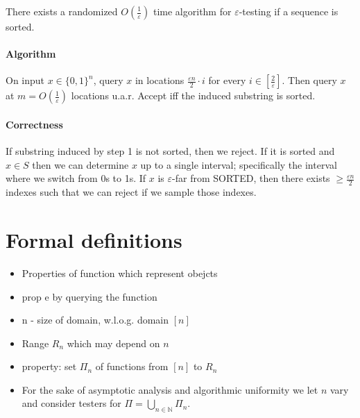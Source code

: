 \documentclass{idc_msc}
\begin{document}
There exists a randomized \(O(\frac{1}{\varepsilon})\) time algorithm for \(\varepsilon\)-testing if a sequence is sorted.

\paragraph{Algorithm}

On input \(x \in {\{0,1\}}^{n}\), query \(x\) in locations \(\frac{\varepsilon n}{2} \cdot i\) for every \(i \in [\frac{2}{\varepsilon}]\).
Then query \(x\) at \(m = O(\frac{1}{\varepsilon})\) locations u.a.r.
Accept iff the induced substring is sorted.

\paragraph{Correctness}

If substring induced by step 1 is not sorted, then we reject.
If it is sorted and \(x \in S\) then we can determine \(x\) up to a single interval; specifically the interval where we switch from 0s to 1s.
If \(x\) is \(\varepsilon\)-far from SORTED, then there exists \(\ge \frac{\varepsilon n}{2}\) indexes such that we can reject if we sample those indexes.



\pagebreak
\section{Formal definitions}

\begin{itemize}
  \item Properties of function which represent obejcts
  \item prop e by querying the function
  \item n - size of domain, w.l.o.g. domain \([n]\)
  \item Range \(R_n\) which may depend on \(n\)
  \item property: set \(\Pi_n\) of functions from \([n]\) to \(R_n\)
  \item For the sake of asymptotic analysis and algorithmic uniformity we let \(n\) vary and consider testers for \(\Pi = \bigcup_{n \in \mathbb{N}} \Pi_n\).
\end{itemize}
\end{document}
